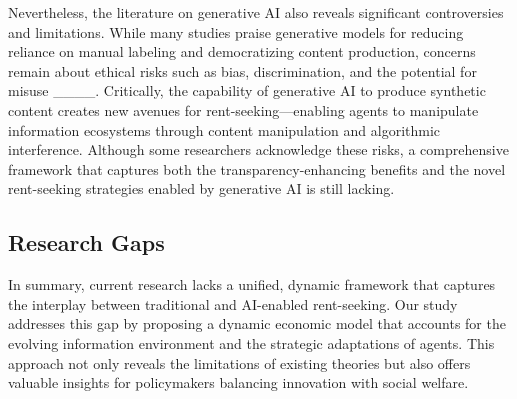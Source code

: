 Nevertheless, the literature on generative AI also reveals significant controversies and limitations. While many studies praise generative models for reducing reliance on manual labeling and democratizing content production, concerns remain about ethical risks such as bias, discrimination, and the potential for misuse ____. Critically, the capability of generative AI to produce synthetic content creates new avenues for rent-seeking—enabling agents to manipulate information ecosystems through content manipulation and algorithmic interference. Although some researchers acknowledge these risks, a comprehensive framework that captures both the transparency-enhancing benefits and the novel rent-seeking strategies enabled by generative AI is still lacking.

\subsection{Research Gaps}

In summary, current research lacks a unified, dynamic framework that captures the interplay between traditional and AI-enabled rent-seeking. Our study addresses this gap by proposing a dynamic economic model that accounts for the evolving information environment and the strategic adaptations of agents. This approach not only reveals the limitations of existing theories but also offers valuable insights for policymakers balancing innovation with social welfare.